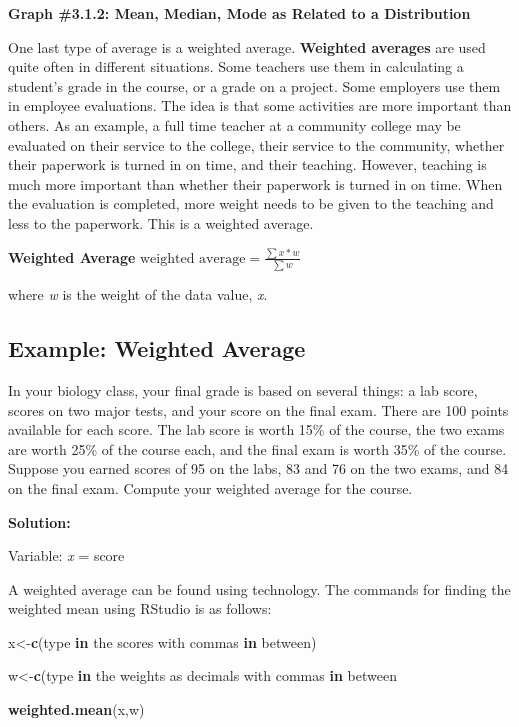 \documentclass[
]{book}
\newenvironment{Shaded}{\begin{snugshade}}{\end{snugshade}}
\newcommand{\ControlFlowTok}[1]{\textcolor[rgb]{0.13,0.29,0.53}{\textbf{#1}}}
\newcommand{\KeywordTok}[1]{\textcolor[rgb]{0.13,0.29,0.53}{\textbf{#1}}}
\newcommand{\NormalTok}[1]{#1}
\begin{document}
\textbf{Graph \#3.1.2: Mean, Median, Mode as Related to a Distribution}

One last type of average is a weighted average. \textbf{Weighted averages} are used quite often in different situations. Some teachers use them in calculating a student's grade in the course, or a grade on a project. Some employers use them in employee evaluations. The idea is that some activities are more
important than others. As an example, a full time teacher at a community college may be evaluated on their service to the college, their service to the community, whether their paperwork is turned in on time, and their teaching. However, teaching is much more important than whether their paperwork is turned in on time. When the evaluation is completed, more weight needs to be given to the teaching and less to the paperwork. This is a weighted average.

\textbf{Weighted Average}
\(\text{weighted average}=\frac{\sum{x*w}}{\sum{w}}\)

where \emph{w} is the weight of the data value, \emph{x}.

\hypertarget{example-weighted-average}{%
\subsection{Example: Weighted Average}\label{example-weighted-average}}

In your biology class, your final grade is based on several things: a lab score, scores on two major tests, and your score on the final exam. There are 100 points available for each score. The lab score is worth 15\% of the course, the two exams are worth 25\% of the course each, and the final exam is worth 35\% of the course. Suppose you earned scores of 95 on the labs, 83 and 76 on the two exams, and 84 on the final exam. Compute your weighted average for the course.

\textbf{Solution:}

Variable: \emph{x} = score

A weighted average can be found using technology. The commands for finding the weighted mean using RStudio is as follows:

\begin{Shaded}
\begin{Highlighting}[]
\NormalTok{ x<-}\KeywordTok{c}\NormalTok{(type }\ControlFlowTok{in}\NormalTok{ the scores with commas }\ControlFlowTok{in}\NormalTok{ between)}

\NormalTok{ w<-}\KeywordTok{c}\NormalTok{(type }\ControlFlowTok{in}\NormalTok{ the weights as decimals with commas }\ControlFlowTok{in}\NormalTok{ between}

 \KeywordTok{weighted.mean}\NormalTok{(x,w)}
\end{Highlighting}
\end{Shaded}
\end{document}
